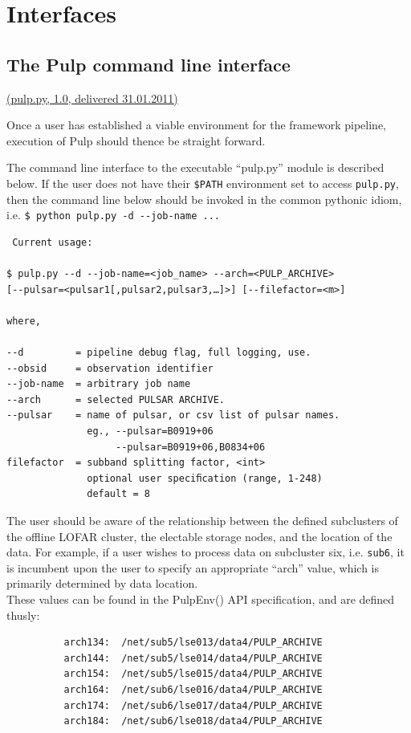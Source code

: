 \documentclass[a4paper,10pt,bibtotoc]{scrartcl}
\begin{document}
\section{Interfaces}
\label{sec:interfaces}
\subsection{The Pulp command line interface}

\underline{(pulp.py, 1.0, delivered 31.01.2011)}

Once a user has established a viable environment for the framework pipeline, execution of Pulp should thence be straight forward.

The command line interface to the executable ``pulp.py'' module is described below.  If the user does not have their \verb|$PATH| environment set to access \verb|pulp.py|, then the command line below should be invoked in the common pythonic idiom,\\
 i.e. \verb|$ python pulp.py -d --job-name ...|\\
\begin{verbatim}
 Current usage:

$ pulp.py --d --job-name=<job_name> --arch=<PULP_ARCHIVE>
[--pulsar=<pulsar1[,pulsar2,pulsar3,…]>] [--filefactor=<m>]

where,

--d         = pipeline debug flag, full logging, use.
--obsid     = observation identifier          
--job-name  = arbitrary job name             
--arch      = selected PULSAR ARCHIVE.
--pulsar    = name of pulsar, or csv list of pulsar names.
              eg., --pulsar=B0919+06
                   --pulsar=B0919+06,B0834+06
filefactor  = subband splitting factor, <int>
              optional user speciﬁcation (range, 1-248)
              default = 8
\end{verbatim}
The user should be aware of the relationship between the defined subclusters of the offline LOFAR cluster, the electable storage nodes, and the location of the data.  For example, if a user wishes to process data on subcluster six, i.e. \verb|sub6|, it is incumbent upon the user to specify an appropriate ``arch'' value,  which is primarily determined by data location.  \\
These values can be found in the PulpEnv() API specification, and are defined thusly:
\begin{verbatim}
          arch134:  /net/sub5/lse013/data4/PULP_ARCHIVE
          arch144:  /net/sub5/lse014/data4/PULP_ARCHIVE
          arch154:  /net/sub5/lse015/data4/PULP_ARCHIVE
          arch164:  /net/sub6/lse016/data4/PULP_ARCHIVE
          arch174:  /net/sub6/lse017/data4/PULP_ARCHIVE
          arch184:  /net/sub6/lse018/data4/PULP_ARCHIVE
\end{verbatim}
\end{document}
